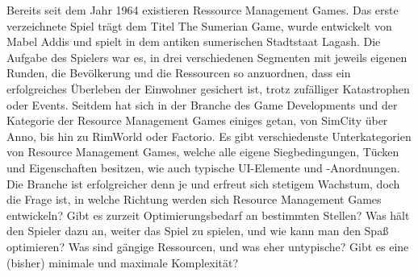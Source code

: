 
Bereits seit dem Jahr 1964 existieren Ressource Management Games. Das erste verzeichnete Spiel trägt dem Titel \glqq The Sumerian Game\grqq, wurde entwickelt von Mabel Addis und spielt in dem antiken sumerischen Stadtstaat Lagash. Die Aufgabe des Spielers war es, in drei verschiedenen Segmenten mit jeweils eigenen Runden, die Bevölkerung und die Ressourcen so anzuordnen, dass ein erfolgreiches Überleben der Einwohner gesichert ist, trotz zufälliger Katastrophen oder Events. Seitdem hat sich in der Branche des Game Developments und der Kategorie der Resource Management Games einiges getan, von SimCity über Anno, bis hin zu RimWorld oder Factorio. Es gibt verschiedenste Unterkategorien von Resource Management Games, welche alle eigene Siegbedingungen, Tücken und Eigenschaften besitzen, wie auch typische UI-Elemente und -Anordnungen. Die Branche ist erfolgreicher denn je und erfreut sich stetigem Wachstum, doch die Frage ist, in welche Richtung werden sich Resource Management Games entwickeln? Gibt es zurzeit Optimierungsbedarf an bestimmten Stellen? Was hält den Spieler dazu an, weiter das Spiel zu spielen, und wie kann man den Spaß optimieren? Was sind gängige Ressourcen, und was eher untypische? Gibt es eine (bisher) minimale und maximale Komplexität?


